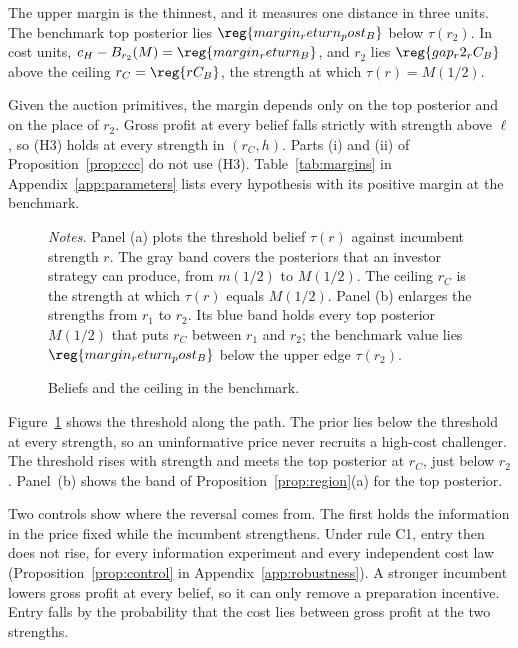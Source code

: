 The upper margin is the thinnest, and it measures one distance in three units. The benchmark top posterior lies
\(\reg{margin_return_post_B}\) below \(\tau(r_2)\). In cost units, \(c_H-B_{r_2}(M)=\reg{margin_return_B}\), and
\(r_2\) lies \(\reg{gap_r2_rC_B}\) above the ceiling \(r_C=\reg{rC_B}\), the strength at which \(\tau(r)=M(1/2)\).

Given the auction primitives, the margin depends only on the top posterior and on the place of \(r_2\). Gross
profit at every belief falls strictly with strength above \(\ell\), so (H3) holds at every strength in \((r_C,h)\).
Parts (i) and (ii) of Proposition~\ref{prop:ccc} do not use (H3). Table~\ref{tab:margins} in
Appendix~\ref{app:parameters} lists every hypothesis with its positive margin at the benchmark.

\begin{figure}[tbp]
\centering
{}
\caption{Beliefs and the ceiling in the benchmark.}\label{fig:beliefs}
\par\medskip
\begin{minipage}{\linewidth}\footnotesize\singlespacing
\textit{Notes.} Panel (a) plots the threshold belief \(\tau(r)\) against incumbent strength \(r\). The gray band
covers the posteriors that an investor strategy can produce, from \(m(1/2)\) to \(M(1/2)\). The ceiling \(r_C\) is the
strength at which \(\tau(r)\) equals \(M(1/2)\). Panel (b) enlarges the strengths from \(r_1\) to \(r_2\). Its blue band
holds every top posterior \(M(1/2)\) that puts \(r_C\) between \(r_1\) and \(r_2\); the benchmark value lies
\(\reg{margin_return_post_B}\) below the upper edge \(\tau(r_2)\).
\end{minipage}
\end{figure}

Figure~\ref{fig:beliefs} shows the threshold along the path. The prior lies below the threshold at every strength,
so an uninformative price never recruits a high-cost challenger. The threshold rises with strength and meets the top
posterior at \(r_C\), just below \(r_2\). Panel~(b) shows the band of Proposition~\ref{prop:region}(a) for the top
posterior.

Two controls show where the reversal comes from. The first holds the information in the price fixed while the
incumbent strengthens. Under rule C1, entry then does not rise, for every information experiment and every
independent cost law (Proposition~\ref{prop:control} in Appendix~\ref{app:robustness}). A stronger incumbent lowers gross profit at every
belief, so it can only remove a preparation incentive. Entry falls by the probability that the cost lies between gross
profit at the two strengths.

